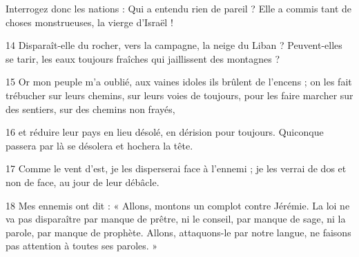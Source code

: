 Interrogez donc les nations : Qui a entendu rien de pareil ? Elle a commis tant de choses monstrueuses, la vierge d’Israël !

14 Disparaît-elle du rocher, vers la campagne, la neige du Liban ? Peuvent-elles se tarir, les eaux toujours fraîches qui jaillissent des montagnes ?

15 Or mon peuple m’a oublié, aux vaines idoles ils brûlent de l’encens ; on les fait trébucher sur leurs chemins, sur leurs voies de toujours, pour les faire marcher sur des sentiers, sur des chemins non frayés,

16 et réduire leur pays en lieu désolé, en dérision pour toujours. Quiconque passera par là se désolera et hochera la tête.

17 Comme le vent d’est, je les disperserai face à l’ennemi ; je les verrai de dos et non de face, au jour de leur débâcle.

18 Mes ennemis ont dit : « Allons, montons un complot contre Jérémie. La loi ne va pas disparaître par manque de prêtre, ni le conseil, par manque de sage, ni la parole, par manque de prophète. Allons, attaquons-le par notre langue, ne faisons pas attention à toutes ses paroles. »